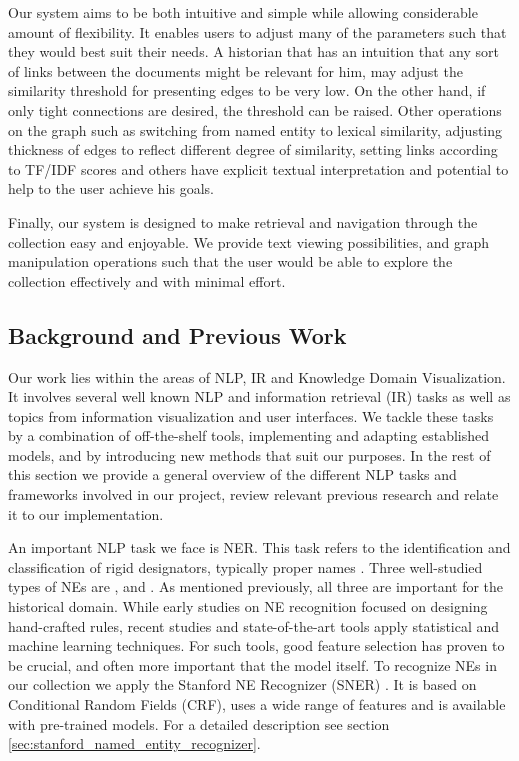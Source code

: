 Our system aims to be both intuitive and simple while allowing considerable amount of flexibility. It enables users to adjust many of the 
parameters such that they would best suit their needs. A historian that has an intuition that any sort of links between the documents might 
be relevant for him, may adjust the similarity threshold for presenting edges to be very low. On the other hand, if only tight connections 
are desired, the threshold can be raised. Other operations on the graph such as switching from named entity to lexical similarity, adjusting 
thickness of edges to reflect different degree of similarity, setting links according to TF/IDF scores and others have explicit textual 
interpretation and potential to help to the user achieve his goals. 

Finally, our system is designed to make retrieval and navigation through the collection easy and enjoyable. We provide text viewing 
possibilities, and graph manipulation operations such that the user would be able to explore the collection effectively and with minimal effort.


\subsection {Background and Previous Work}
\label{sec:nlp_background}


Our work lies within the areas of NLP, IR and Knowledge Domain Visualization.
It involves several well known NLP and information retrieval (IR) tasks as well as topics from information visualization and user interfaces. 
We tackle these tasks by a combination of off-the-shelf tools, implementing and adapting established models, and by introducing new methods 
that suit our purposes.  In the rest of this section we provide a general overview of the different NLP tasks and frameworks involved in our 
project, review relevant previous research and relate it to our implementation. 

An important NLP task we face is NER. This task refers to the identification and classification of rigid designators, 
typically proper names \cite{NEsurvey2009}. Three well-studied types of NEs are ,  and . 
As mentioned previously, all three are important for the historical domain. While early studies on NE recognition focused on designing 
hand-crafted rules, recent studies and state-of-the-art tools apply statistical and machine learning techniques. For such tools, 
good feature selection has proven to be crucial, and often more important that the model itself.  
To recognize NEs in our collection we apply the Stanford NE Recognizer (SNER) \cite{sner}. It is based on Conditional Random Fields (CRF), 
uses a wide range of features and is available with pre-trained models.  For a detailed description see section \ref{sec:stanford_named_entity_recognizer}.

